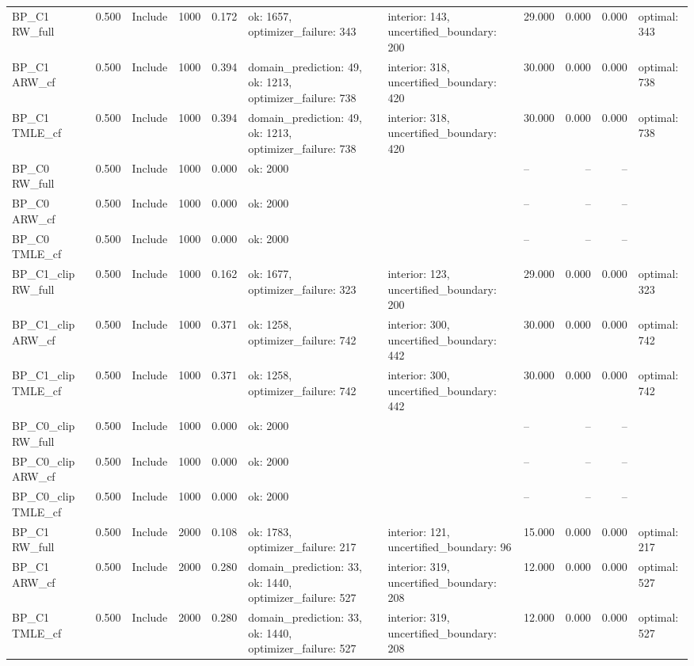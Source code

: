 \begin{tabular}{llllrlllrrl}
BP\_C1 RW\_full & 0.500 & Include & 1000 & 0.172 & ok: 1657, optimizer\_failure: 343 & interior: 143, uncertified\_boundary: 200 & 29.000 & 0.000 & 0.000 & optimal: 343 \\
BP\_C1 ARW\_cf & 0.500 & Include & 1000 & 0.394 & domain\_prediction: 49, ok: 1213, optimizer\_failure: 738 & interior: 318, uncertified\_boundary: 420 & 30.000 & 0.000 & 0.000 & optimal: 738 \\
BP\_C1 TMLE\_cf & 0.500 & Include & 1000 & 0.394 & domain\_prediction: 49, ok: 1213, optimizer\_failure: 738 & interior: 318, uncertified\_boundary: 420 & 30.000 & 0.000 & 0.000 & optimal: 738 \\
BP\_C0 RW\_full & 0.500 & Include & 1000 & 0.000 & ok: 2000 &  & -- & -- & -- &  \\
BP\_C0 ARW\_cf & 0.500 & Include & 1000 & 0.000 & ok: 2000 &  & -- & -- & -- &  \\
BP\_C0 TMLE\_cf & 0.500 & Include & 1000 & 0.000 & ok: 2000 &  & -- & -- & -- &  \\
BP\_C1\_clip RW\_full & 0.500 & Include & 1000 & 0.162 & ok: 1677, optimizer\_failure: 323 & interior: 123, uncertified\_boundary: 200 & 29.000 & 0.000 & 0.000 & optimal: 323 \\
BP\_C1\_clip ARW\_cf & 0.500 & Include & 1000 & 0.371 & ok: 1258, optimizer\_failure: 742 & interior: 300, uncertified\_boundary: 442 & 30.000 & 0.000 & 0.000 & optimal: 742 \\
BP\_C1\_clip TMLE\_cf & 0.500 & Include & 1000 & 0.371 & ok: 1258, optimizer\_failure: 742 & interior: 300, uncertified\_boundary: 442 & 30.000 & 0.000 & 0.000 & optimal: 742 \\
BP\_C0\_clip RW\_full & 0.500 & Include & 1000 & 0.000 & ok: 2000 &  & -- & -- & -- &  \\
BP\_C0\_clip ARW\_cf & 0.500 & Include & 1000 & 0.000 & ok: 2000 &  & -- & -- & -- &  \\
BP\_C0\_clip TMLE\_cf & 0.500 & Include & 1000 & 0.000 & ok: 2000 &  & -- & -- & -- &  \\
BP\_C1 RW\_full & 0.500 & Include & 2000 & 0.108 & ok: 1783, optimizer\_failure: 217 & interior: 121, uncertified\_boundary: 96 & 15.000 & 0.000 & 0.000 & optimal: 217 \\
BP\_C1 ARW\_cf & 0.500 & Include & 2000 & 0.280 & domain\_prediction: 33, ok: 1440, optimizer\_failure: 527 & interior: 319, uncertified\_boundary: 208 & 12.000 & 0.000 & 0.000 & optimal: 527 \\
BP\_C1 TMLE\_cf & 0.500 & Include & 2000 & 0.280 & domain\_prediction: 33, ok: 1440, optimizer\_failure: 527 & interior: 319, uncertified\_boundary: 208 & 12.000 & 0.000 & 0.000 & optimal: 527 \\

\end{tabular}
